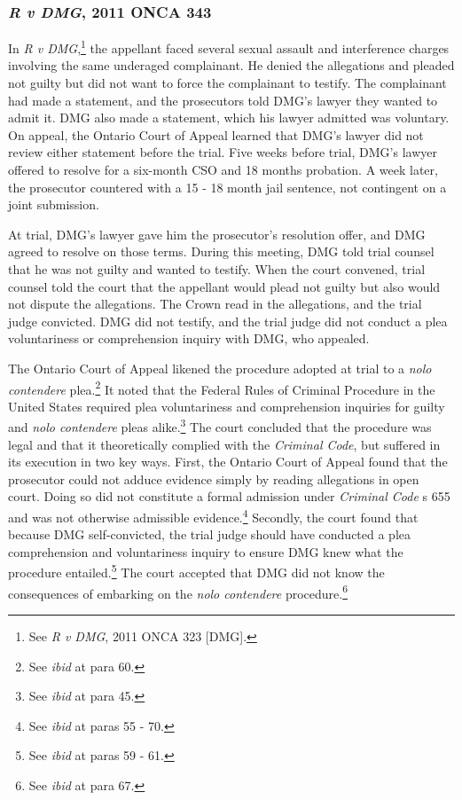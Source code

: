\subsubsection{\textit{R v DMG}, 2011 ONCA 343}

In \textit{R v DMG},\footnote{See \textit{R v DMG}, 2011 ONCA 323 [DMG].} the appellant faced several sexual assault and interference charges involving the same underaged complainant. He denied the allegations and pleaded not guilty but did not want to force the complainant to testify. The complainant had made a statement, and the prosecutors told DMG's lawyer they wanted to admit it. DMG also made a statement, which his lawyer admitted was voluntary. On appeal, the Ontario Court of Appeal learned that DMG's lawyer did not review either statement before the trial. Five weeks before trial, DMG's lawyer offered to resolve for a six-month CSO and 18 months probation. A week later, the prosecutor countered with a 15 - 18 month jail sentence, not contingent on a joint submission. 

At trial, DMG's lawyer gave him the prosecutor's resolution offer, and DMG agreed to resolve on those terms. During this meeting, DMG told trial counsel that he was not guilty and wanted to testify. When the court convened, trial counsel told the court that the appellant would plead not guilty but also would not dispute the allegations. The Crown read in the allegations, and the trial judge convicted. DMG did not testify, and the trial judge did not conduct a plea voluntariness or comprehension inquiry with DMG, who appealed.

The Ontario Court of Appeal likened the procedure adopted at trial to a \textit{nolo contendere} plea.\footnote{See \textit{ibid} at para 60.} It noted that the Federal Rules of Criminal Procedure in the United States required plea voluntariness and comprehension inquiries for guilty and \textit{nolo contendere} pleas alike.\footnote{See \textit{ibid} at para 45.} The court concluded that the procedure was legal  and that it theoretically complied with the \textit{Criminal Code}, but suffered in its execution in two key ways. First, the Ontario Court of Appeal found that the prosecutor could not adduce evidence simply by reading allegations in open court. Doing so did not constitute a formal admission under \textit{Criminal Code} s 655 and was not otherwise admissible evidence.\footnote{See \textit{ibid} at paras 55 - 70.} Secondly, the court found that because DMG self-convicted, the trial judge should have conducted a plea comprehension and voluntariness inquiry to ensure DMG knew what the procedure entailed.\footnote{See \textit{ibid} at paras 59 - 61.} The court accepted that DMG did not know the consequences of embarking on the \textit{nolo contendere} procedure.\footnote{See \textit{ibid} at para 67.}

